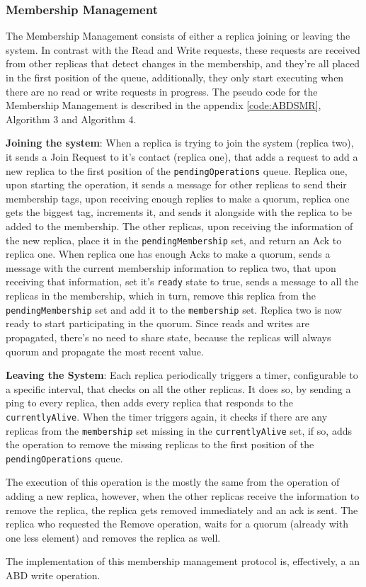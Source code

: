 \documentclass[10pt,a4paper,twocolumn]{article}
\begin{document}
\subsubsection{Membership Management}
\label{sec:abdmenb}
The Membership Management consists of either a replica joining or leaving the system. In contrast with the Read and Write requests, these requests are received from other replicas that detect changes in the membership, and they're all placed in the first position of the queue, additionally, they only start executing when there are no read or write requests in progress. The pseudo code for the Membership Management is described in the appendix \ref{code:ABDSMR}, Algorithm 3 and Algorithm 4.
\par \textbf{Joining the system}: When a replica is trying to join the system (replica two), it sends a Join Request to it's contact (replica one), that adds a request to add a new replica to the first position of the \verb|pendingOperations| queue. Replica one, upon starting the operation, it sends a message for other replicas to send their membership tags, upon receiving enough replies to make a quorum, replica one gets the biggest tag, increments it, and sends it alongside with the replica to be added to the membership. The other replicas, upon receiving the information of the new replica, place it in the \verb|pendingMembership| set, and return an Ack to replica one. When replica one has enough Acks to make a quorum, sends a message with the current membership information to replica two, that upon receiving that information, set it's \verb|ready| state to true, sends a message to all the replicas in the membership, which in turn, remove this replica from the \verb|pendingMembership| set and add it to the \verb|membership| set. Replica two is now ready to start participating in the quorum. Since reads and writes are propagated, there's no need to share state, because the replicas will always quorum and propagate the most recent value.
\par \textbf{Leaving the System}:  Each replica periodically triggers a timer, configurable to a specific interval, that checks on all the other replicas. It does so, by sending a ping to every replica, then adds every replica that responds to the \verb|currentlyAlive|. When the timer triggers again, it checks if there are any replicas from the \verb|membership| set missing in the \verb|currentlyAlive| set, if so, adds the operation to remove the missing replicas to the first position of the \verb|pendingOperations| queue.
\par The execution of this operation is the mostly the same from the operation of adding a new replica, however, when the other replicas receive the information to remove the replica, the replica gets removed immediately and an ack is sent. The replica who requested the Remove operation, waits for a quorum (already with one less element) and removes the replica as well.
\par The implementation of this membership management protocol is, effectively, a an ABD write operation.
\end{document}
